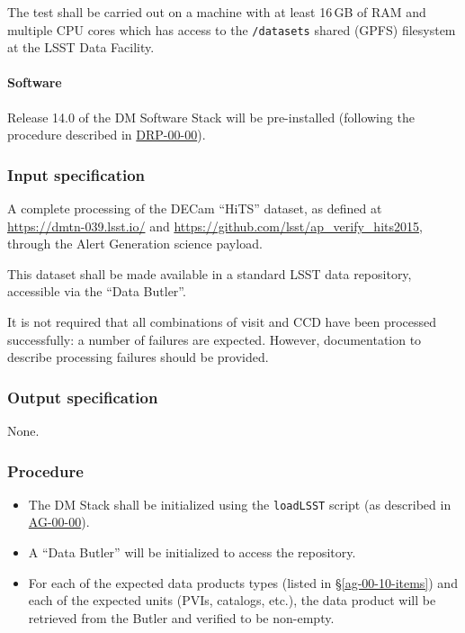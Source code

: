 The test shall be carried out on a machine with at least 16\,GB of RAM and
multiple CPU cores which has access to the \texttt{/datasets} shared (GPFS)
filesystem at the LSST Data Facility.

\paragraph{Software}

Release 14.0 of the DM Software Stack will be pre-installed (following the
procedure described in \hyperref[drp-00-00]{DRP-00-00}).

\subsubsection{Input specification}

A complete processing of the DECam ``HiTS'' dataset, as defined at
\url{https://dmtn-039.lsst.io/} and
\url{https://github.com/lsst/ap_verify_hits2015}, through the Alert
Generation science payload.

This dataset shall be made available in a standard LSST data repository,
accessible via the ``Data Butler''.

It is not required that all combinations of visit and CCD have been processed
successfully: a number of failures are expected. However, documentation to
describe processing failures should be provided.

\subsubsection{Output specification}

None.

\subsubsection{Procedure}

\begin{itemize}

  \item{The DM Stack shall be initialized using the \texttt{loadLSST} script
  (as described in \hyperref[ag-00-00]{AG-00-00}).}

  \item{A ``Data Butler'' will be initialized to access the repository.}

  \item{For each of the expected data products types (listed in \S\ref{ag-00-10-items})
  and each of the expected units (PVIs, catalogs, etc.), the data product will be
  retrieved from the Butler and verified to be non-empty.}

\end{itemize}
